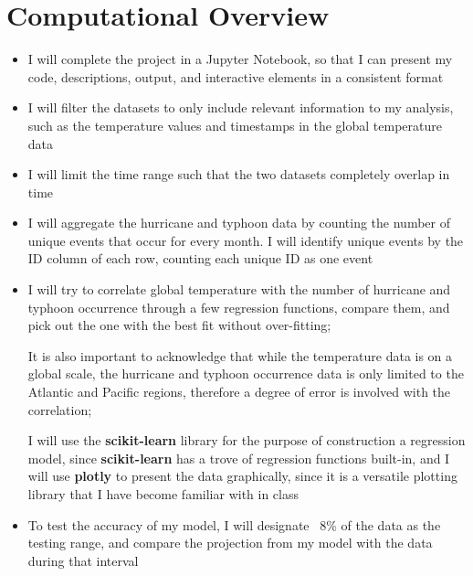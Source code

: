 \documentclass[fontsize=11pt]{article}
\begin{document}
\section*{Computational Overview}
\begin{itemize}
    \item I will complete the project in a Jupyter Notebook, so that I can present my code, descriptions, output, and interactive elements in a consistent format

    \item I will filter the datasets to only include relevant information to my analysis, such as the temperature values and timestamps in the global temperature data

    \item I will limit the time range such that the two datasets completely overlap in time


    \item I will aggregate the hurricane and typhoon data by counting the number of unique events that occur for every month. I will identify unique events by the ID column of each row, counting each unique ID as one event

    \item I will try to correlate global temperature with the number of hurricane and typhoon occurrence through a few regression functions, compare them, and pick out the one with the best fit without over-fitting;

    It is also important to acknowledge that while the temperature data is on a global scale, the hurricane and typhoon occurrence data is only limited to the Atlantic and Pacific regions, therefore a degree of error is involved with the correlation;

    I will use the \textbf{scikit-learn} library for the purpose of construction a regression model, since \textbf{scikit-learn} has a trove of regression functions built-in, and I will use \textbf{plotly} to present the data graphically, since it is a versatile plotting library that I have become familiar with in class

    \item To test the accuracy of my model, I will designate ~8\% of the data as the testing range, and compare the projection from my model with the data during that interval

\end{itemize}
\end{document}
